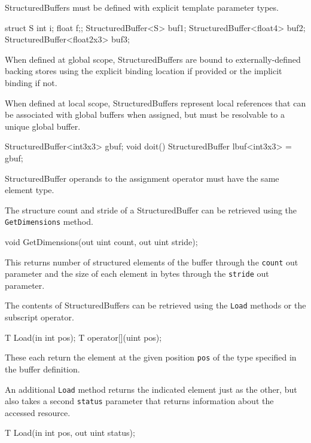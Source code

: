 
StructuredBuffers must be defined with explicit template parameter types.
\begin{HLSL}
  struct S {int i; float f;};
  StructuredBuffer<S> buf1;
  StructuredBuffer<float4> buf2;
  StructuredBuffer<float2x3> buf3;
\end{HLSL}

When defined at global scope, StructuredBuffers are bound to externally-defined backing stores
using the explicit binding location if provided or the implicit binding if not.

When defined at local scope, StructuredBuffers represent local references
that can be associated with global buffers when assigned,
but must be resolvable to a unique global buffer.

\begin{HLSL}
  StructuredBuffer<int3x3> gbuf;
  void doit() {
    StructuredBuffer lbuf<int3x3> = gbuf;
  }
\end{HLSL}
StructuredBuffer operands to the assignment operator must have the same element type.


The structure count and stride of a StructuredBuffer can be retrieved using the \texttt{GetDimensions} method.
\begin{HLSL}
void GetDimensions(out uint count, out uint stride);
\end{HLSL}

This returns number of structured elements of the buffer through the \texttt{count} out parameter
and the size of each element in bytes through the \texttt{stride} out parameter.


The contents of StructuredBuffers can be retrieved using the \texttt{Load} methods
or the subscript operator.

\begin{HLSL}
 T Load(in int pos);
 T operator[](uint pos);
\end{HLSL}

These each return the element at the given position \texttt{pos} of the type specified in the buffer definition.

An additional \texttt{Load} method returns the indicated element just as the other,
but also takes a second \texttt{status} parameter that returns information about the accessed resource.
\begin{HLSL}
 T Load(in int pos, out uint status);
\end{HLSL}

